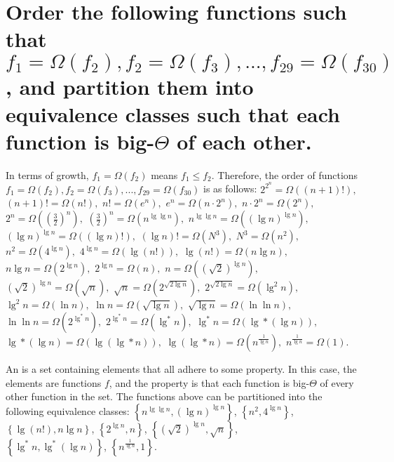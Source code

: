\section[Problem 6]{Order the following functions such that $f_1 = \Omega(f_2), f_2 = \Omega(f_3), ..., f_{29} = \Omega(f_{30})$, and partition them into equivalence classes such that each function is big-$\Theta$ of each other.}

In terms of growth, $f_1 = \Omega(f_2)$ means $f_1 \leq f_2$. Therefore, the order of functions $f_1 = \Omega(f_2), f_2 = \Omega(f_3), ..., f_{29} = \Omega(f_{30})$ is as follows:
$2^{2^n} = \Omega \left((n + 1)! \right), $
$(n + 1)! = \Omega \left(n! \right), $
$n! = \Omega \left(e^n \right), $
$e^n = \Omega \left(n \cdot 2^n \right), $
$n \cdot 2^n = \Omega \left(2^n \right), $
$2^n = \Omega \left(\left( \frac{3}{2} \right)^n \right), $
$\left( \frac{3}{2} \right)^n = \Omega \left(n^{\lg \lg n} \right), $
$n^{\lg \lg n} = \Omega \left(\left( \lg n \right)^{\lg n} \right), $
$\left( \lg n \right)^{\lg n} = \Omega \left((\lg n)! \right), $
$(\lg n)! = \Omega \left(N^3 \right), $
$N^3 = \Omega \left(n^2 \right), $
$n^2 = \Omega \left(4^{\lg n} \right), $
$4^{\lg n} = \Omega \left(\lg (n!) \right), $
$\lg (n!)  = \Omega \left(n \lg n \right), $
$n \lg n = \Omega \left(2^{\lg n} \right), $
$2^{\lg n} = \Omega \left(n \right), $
$n = \Omega \left(\left( \sqrt{2} \right)^{\lg n} \right), $
$\left( \sqrt{2} \right)^{\lg n} = \Omega \left(\sqrt{n} \right), $
$\sqrt{n} = \Omega \left(2^{\sqrt{2 \lg n}} \right), $
$2^{\sqrt{2 \lg n}} = \Omega \left(\lg ^2 n \right), $
$\lg ^2 n = \Omega \left(\ln n \right), $
$\ln n = \Omega \left(\sqrt{\lg n} \right), $
$\sqrt{\lg n} = \Omega \left(\ln \ln n \right), $
$\ln \ln n = \Omega \left(2^{\lg ^* n} \right), $
$2^{\lg ^* n} = \Omega \left(\lg ^* n \right), $
$\lg ^* n = \Omega \left(\lg * (\lg n) \right), $
$\lg * (\lg n) = \Omega \left(\lg (\lg * n) \right), $
$\lg (\lg * n) = \Omega \left(n^{\frac{1}{\lg n}} \right), $
$n^{\frac{1}{\lg n}} = \Omega (1)$. 

An  is a set containing elements that all adhere to some property. In this case, the elements are functions $f$, and the property is that each function is big-$\Theta$ of every other function in the set. The functions above can be partitioned into the following equivalence classes:
$\left\{ n^{\lg \lg n}, \left( \lg n \right)^{\lg n} \right\}$, 
$\left\{ n^2, 4^{\lg n} \right\}$,
$\left\{ \lg(n!), n \lg n \right\}$,
$\left\{ 2^{\lg n}, n \right\}$,
$\left\{ \left( \sqrt{2} \right) ^{\lg n}, \sqrt{n} \right\}$, \\ %
$\left\{ \lg^* n, \lg^* (\lg n) \right\}$,
$\left\{ n^{\frac{1}{\lg n}}, 1 \right\}$.

